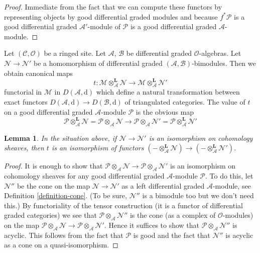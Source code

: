 \documentclass{stacks-project}
\theoremstyle{plain}
\newtheorem{lemma}[subsection]{Lemma}
\theoremstyle{definition}
\theoremstyle{remark}
\numberwithin{equation}{subsection}
\begin{document}
\begin{proof}
Immediate from the fact that we can compute these functors
by representing objects by good differential graded modules
and because $f^*\mathcal{P}$ is a good differential
graded $\mathcal{A}'$-module of $\mathcal{P}$ is a good
differential graded $\mathcal{A}$-module.
\end{proof}

\noindent
Let $(\mathcal{C}, \mathcal{O})$ be a ringed site. Let
$\mathcal{A}$, $\mathcal{B}$ be differential graded $\mathcal{O}$-algebras.
Let $\mathcal{N} \to \mathcal{N}'$ be a homomorphism of differential graded
$(\mathcal{A}, \mathcal{B})$-bimodules. Then we obtain canonical
maps
$$
t :
\mathcal{M} \otimes_\mathcal{A}^\mathbf{L} \mathcal{N}
\longrightarrow
\mathcal{M} \otimes_\mathcal{A}^\mathbf{L} \mathcal{N}'
$$
functorial in $\mathcal{M}$ in $D(\mathcal{A}, \text{d})$
which define a natural transformation between exact functors
$D(\mathcal{A}, \text{d}) \to D(\mathcal{B}, \text{d})$
of triangulated categories. The value of $t$ on a good differential
graded $\mathcal{A}$-module $\mathcal{P}$ is the obvious map
$$
\mathcal{P} \otimes_\mathcal{A}^\mathbf{L} \mathcal{N} =
\mathcal{P} \otimes_\mathcal{A} \mathcal{N}
\longrightarrow
\mathcal{P} \otimes_\mathcal{A} \mathcal{N}' =
\mathcal{P} \otimes_\mathcal{A}^\mathbf{L} \mathcal{N}'
$$

\begin{lemma}
\label{lemma-tensor-symmetry}
In the situation above, if $\mathcal{N} \to \mathcal{N}'$ is an isomorphism
on cohomology sheaves, then $t$ is an isomorphism of functors
$(- \otimes_\mathcal{A}^\mathbf{L} \mathcal{N}) \to
(- \otimes_\mathcal{A}^\mathbf{L} \mathcal{N}')$.
\end{lemma}

\begin{proof}
It is enough to show that
$\mathcal{P} \otimes_\mathcal{A} \mathcal{N} \to
\mathcal{P} \otimes_\mathcal{A} \mathcal{N}'$
is an isomorphism on cohomology sheaves for any good differential
graded $\mathcal{A}$-module $\mathcal{P}$.
To do this, let $\mathcal{N}''$ be the cone on the map
$\mathcal{N} \to \mathcal{N}'$ as a left differential graded
$\mathcal{A}$-module, see Definition \ref{definition-cone}.
(To be sure, $\mathcal{N}''$ is a bimodule too but we
don't need this.) By functoriality of the tensor construction
(it is a functor of differential graded categories)
we see that $\mathcal{P} \otimes_\mathcal{A} \mathcal{N}''$
is the cone (as a complex of $\mathcal{O}$-modules) on the map
$\mathcal{P} \otimes_\mathcal{A} \mathcal{N} \to
\mathcal{P} \otimes_\mathcal{A} \mathcal{N}'$.
Hence it suffices to show that
$\mathcal{P} \otimes_\mathcal{A} \mathcal{N}''$
is acyclic. This follows from the fact that $\mathcal{P}$
is good and the fact that $\mathcal{N}''$ is acyclic
as a cone on a quasi-isomorphism.
\end{proof}
\end{document}
